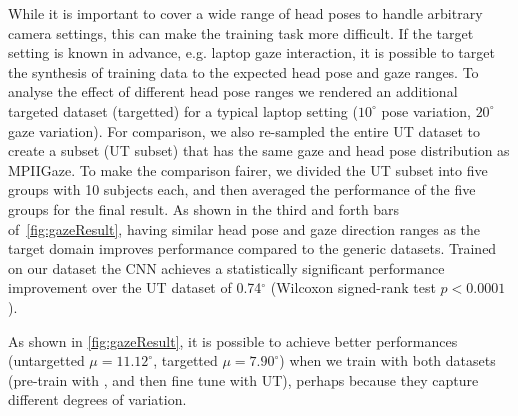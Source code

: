 While it is important to cover a wide range of head poses to handle arbitrary camera settings, this can make the training task more difficult.
If the target setting is known in advance, e.g. laptop gaze interaction, it is  possible to target the synthesis of training data to the expected head pose and gaze ranges.
To analyse the effect of different head pose ranges we rendered an additional targeted dataset (\dataset targetted) for a typical laptop setting ($10^{\circ}$ pose variation, $20^{\circ}$ gaze variation).
For comparison, we also re-sampled the entire UT dataset to create a subset (UT subset) that has the same gaze and head pose distribution as MPIIGaze.
To make the comparison fairer, we divided the UT subset into five groups with 10 subjects each,
and then averaged the performance of the five groups for the final result. 
As shown in the third and forth bars of~\autoref{fig:gazeResult}, having similar head pose and gaze direction ranges as the target domain improves performance compared to the generic datasets.
Trained on our \dataset dataset the CNN achieves a statistically significant performance improvement over the UT dataset of 0.74$^{\circ}$ (Wilcoxon signed-rank test  $p\!<\!0.0001$).

As shown in \autoref{fig:gazeResult}, it is possible to achieve better performances (untargetted $\mu\!=\!11.12^{\circ}$, targetted $\mu\!=\!7.90^{\circ}$) when we train with both datasets (pre-train with \dataset, and then fine tune with UT), perhaps because they capture different degrees of variation.

